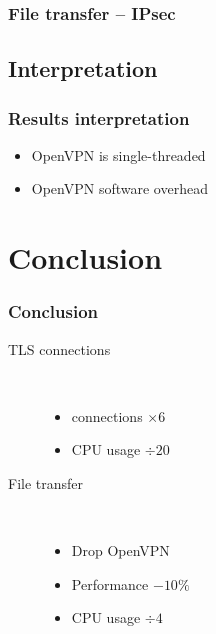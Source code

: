 \documentclass[xcolor={x11names, rgb, usenames, dvipsnames}]{beamer}
\newcommand\Wider[2][3em]{%
\makebox[\linewidth][c]{%
  \begin{minipage}{\dimexpr\textwidth+#1\relax}
  \raggedright#2
  \end{minipage}%
  }%
}
\begin{document}
\begin{frame}
\frametitle{File transfer -- IPsec}
\Wider[1em]{%
	\begin{minipage}[c]{.48\linewidth}
		\begin{tikzpicture}
		
		\end{tikzpicture}
	\end{minipage} \hfill
	\begin{minipage}[c]{.44\linewidth}
		\begin{tikzpicture}
		
		\end{tikzpicture}
		\vspace{0.7cm}
	\end{minipage}
}
\end{frame}


\subsection{Interpretation}
\begin{frame}
\frametitle{Results interpretation}
	\begin{itemize}
		\item OpenVPN is single-threaded
		\item OpenVPN software overhead
	\end{itemize}
\end{frame}




\section{Conclusion}

\begin{frame}
\frametitle{Conclusion}
\begin{description}
	\item[TLS connections]~\\
		\begin{itemize}
			\item connections $\times 6$
			\item CPU usage $\div 20$
		\end{itemize}
	\item[File transfer]~\\
		\begin{itemize}
			\item Drop OpenVPN
			\item Performance $-10\%$
			\item CPU usage $\div 4$
		\end{itemize}
\end{description}
\end{frame}
\end{document}
